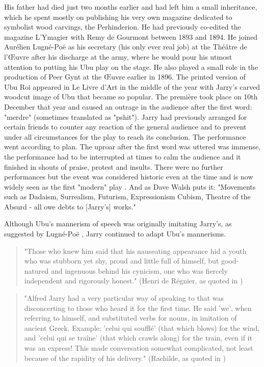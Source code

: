 His father had died just two months earlier and had left him a small inheritance, which he spent mostly on publishing his very own magazine dedicated to symbolist wood carvings, the Perhinderion. He had previously co-edited the magazine L'Ymagier with Remy de Gourmont between 1893 and 1894. He joined Aurélien Lugné-Poë as his secretary (his only ever real job) at the Théâtre de l'Œuvre after his discharge at the army, where he would pour his utmost attention to putting his Ubu play on the stage. He also played a small role in the production of Peer Gynt at the Œuvre earlier in 1896. The printed version of Ubu Roi appeared in Le Livre d'Art in the middle of the year with Jarry's carved woodcut image of Ubu that became so popular. The première took place on 10th December that year and caused an outrage in the audience after the first word: "merdre" (sometimes translated as "pshit"). Jarry had previously arranged for certain friends to counter any reaction of the general audience and to prevent under all circumstances for the play to reach its conclusion. The performance went according to plan. The uproar after the first word was uttered was immense, the performance had to be interrupted at times to calm the audience and it finished in shouts of praise, protest and insults. There were no further performances but the event was considered historic even at the time and is now widely seen as the first "modern" play \citep[p.168-169]{Brotchie2011}. And as Dave Walsh puts it: "Movements such as Dadaism, Surrealism, Futurism, Expressionism Cubism, Theatre of the Absurd - all owe debts to [Jarry's] works." \citep{Walsh2001}

Although Ubu's mannerism of speech was originally imitating Jarry's, as suggested by Lugné-Poë \citep[p.155]{Brotchie2011}, Jarry continued to adapt Ubu's mannerisms.

\begin{quote}
  "Those who knew him said that his nauseating appearance hid a youth who was stubborn yet shy, proud and little full of himself, but good-natured and ingenuous behind his cynicism, one who was fiercely independent and rigorously honest." (Henri de Régnier, as quoted in \citep[p.181]{Brotchie2011})
\end{quote}

\begin{quote}
  "Alfred Jarry had a very particular way of speaking to that was disconcerting to those who heard it for the first time. He said 'we', when referring to himself, and substituted verbs for nouns, in imitation of ancient Greek. Example: 'celui qui soufflé' (that which blows) for the wind, and 'celui qui se traîne' (that which crawls along) for the train, even if it was an express! This made conversation somewhat complicated, not least because of the rapidity of his delivery." (Rachilde, as quoted in \citep[p.181]{Brotchie2011})
\end{quote}

